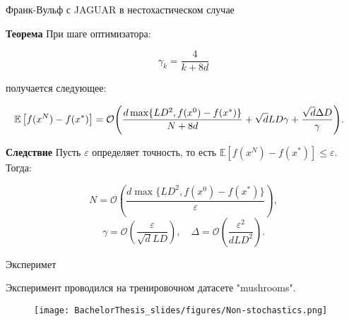 \documentclass{beamer}
\newcommand{\expect}[1]{\mathbb{E}\left[ #1 \right]}
\begin{document}
\begin{frame}{Франк-Вульф с JAGUAR в нестохастическом случае}

    \textbf{Теорема}
        При шаге оптимизатора:
            
        $$\gamma_k = \frac{4}{k + 8d}$$
            
        получается следующее:

        \small{
            \begin{equation*}
                \begin{split}
                    \hspace{-0.3cm}\expect{f(x^{N}) - f(x^*)} = \mathcal{O} \Bigg( \frac{d \max\{L D^2, f(x^0) - f(x^*)\}}{N + 8d} + \sqrt{d} L D \gamma + \frac{\sqrt{d} \Delta D}{\gamma}\Bigg).
                \end{split}
            \end{equation*}
        }

    \textbf{Следствие} Пусть $\varepsilon$ определяет точность, то есть $\expect{f(x^N) - f(x^*)} \leq \varepsilon$. Тогда:

        \begin{equation*}
            N = \mathcal{O} \left( \frac{d \max\{L D^2, f(x^0) - f(x^*)\}}{\varepsilon} \right),
        \end{equation*}
        \begin{equation*}
            \gamma = \mathcal{O} \left(\frac{\varepsilon}{\sqrt{d} L D} \right), \quad
            \Delta = \mathcal{O} \left( \frac{\varepsilon^2}{d L D^2}\right).
         \end{equation*}

\end{frame}


\begin{frame}{Эксперимет}

    Эксперимент проводился на тренировочном датасете "mushrooms".

    \begin{figure}
        \centering
        \texttt{[image: BachelorThesis\_slides/figures/Non-stochastics.png]}
    \end{figure}

\end{frame}

\end{document}
